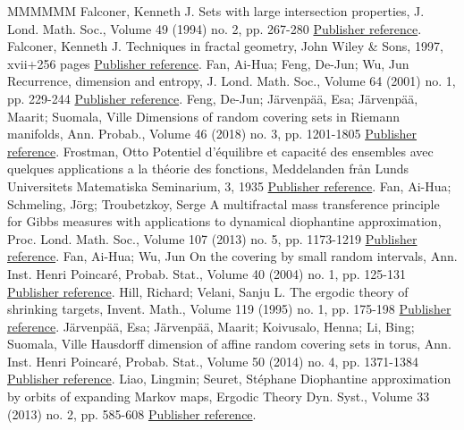 \documentclass[11pt]{article}
\theoremstyle{definition}
\numberwithin{equation}{section}
\numberwithin{figure}{section}
\numberwithin{table}{section}
\begin{document}
\begin{thebibliography}{MMMMMM}
 Falconer, Kenneth J. Sets with large intersection properties, J. Lond. Math. Soc., Volume 49 (1994) no. 2, pp. 267-280 \href{https://ahl.centre-mersenne.org/item/AHL_2019__2__1_0/#falconer2}{Publisher reference}.
 Falconer, Kenneth J. Techniques in fractal geometry, John Wiley \& Sons, 1997, xvii+256 pages \href{https://ahl.centre-mersenne.org/item/AHL_2019__2__1_0/#falconertechniques}{Publisher reference}.
 Fan, Ai-Hua; Feng, De-Jun; Wu, Jun Recurrence, dimension and entropy, J. Lond. Math. Soc., Volume 64 (2001) no. 1, pp. 229-244 \href{https://ahl.centre-mersenne.org/item/AHL_2019__2__1_0/#fanfengwu}{Publisher reference}.
 Feng, De-Jun; Järvenpää, Esa; Järvenpää, Maarit; Suomala, Ville Dimensions of random covering sets in Riemann manifolds, Ann. Probab., Volume 46 (2018) no. 3, pp. 1201-1805 \href{https://ahl.centre-mersenne.org/item/AHL_2019__2__1_0/#fengetal}{Publisher reference}.
 Frostman, Otto Potentiel d’équilibre et capacité des ensembles avec quelques applications a la théorie des fonctions, Meddelanden från Lunds Universitets Matematiska Seminarium, 3, 1935 \href{https://ahl.centre-mersenne.org/item/AHL_2019__2__1_0/#frostman}{Publisher reference}.
 Fan, Ai-Hua; Schmeling, Jörg; Troubetzkoy, Serge A multifractal mass transference principle for Gibbs measures with applications to dynamical diophantine approximation, Proc. Lond. Math. Soc., Volume 107 (2013) no. 5, pp. 1173-1219 \href{https://ahl.centre-mersenne.org/item/AHL_2019__2__1_0/#fanschmelingtroubetzkoy}{Publisher reference}.
 Fan, Ai-Hua; Wu, Jun On the covering by small random intervals, Ann. Inst. Henri Poincaré, Probab. Stat., Volume 40 (2004) no. 1, pp. 125-131 \href{https://ahl.centre-mersenne.org/item/AHL_2019__2__1_0/#fanwu}{Publisher reference}.
 Hill, Richard; Velani, Sanju L. The ergodic theory of shrinking targets, Invent. Math., Volume 119 (1995) no. 1, pp. 175-198 \href{https://ahl.centre-mersenne.org/item/AHL_2019__2__1_0/#hillvelani}{Publisher reference}.
 Järvenpää, Esa; Järvenpää, Maarit; Koivusalo, Henna; Li, Bing; Suomala, Ville Hausdorff dimension of affine random covering sets in torus, Ann. Inst. Henri Poincaré, Probab. Stat., Volume 50 (2014) no. 4, pp. 1371-1384 \href{https://ahl.centre-mersenne.org/item/AHL_2019__2__1_0/#jarvenpaaetal}{Publisher reference}.
 Liao, Lingmin; Seuret, Stéphane Diophantine approximation by orbits of expanding Markov maps, Ergodic Theory Dyn. Syst., Volume 33 (2013) no. 2, pp. 585-608 \href{https://ahl.centre-mersenne.org/item/AHL_2019__2__1_0/#liaoseuret}{Publisher reference}.

\end{thebibliography}
\end{document}
